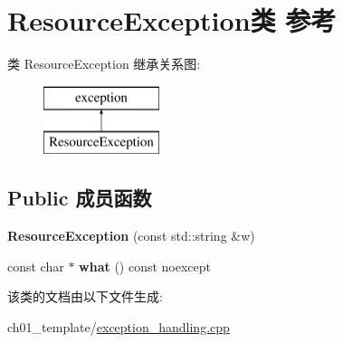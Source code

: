 \hypertarget{class_resource_exception}{}\section{Resource\+Exception类 参考}
\label{class_resource_exception}
类 Resource\+Exception 继承关系图\+:\begin{figure}[H]
\begin{center}
\leavevmode
\includegraphics[height=2.000000cm]{class_resource_exception}
\end{center}
\end{figure}
\subsection*{Public 成员函数}
\begin{DoxyCompactItemize}
\item 
\mbox{\label{class_resource_exception_ace30ba65804b44eaedd77a4de1d7fff1}} 
{\bfseries Resource\+Exception} (const std\+::string \&w)
\item 
\mbox{\label{class_resource_exception_aa7f527a3bfab96541886a395415fc686}} 
const char $\ast$ {\bfseries what} () const noexcept
\end{DoxyCompactItemize}


该类的文档由以下文件生成\+:\begin{DoxyCompactItemize}
\item 
ch01\+\_\+template/\mbox{\hyperlink{exception__handling_8cpp}{exception\+\_\+handling.\+cpp}}\end{DoxyCompactItemize}
